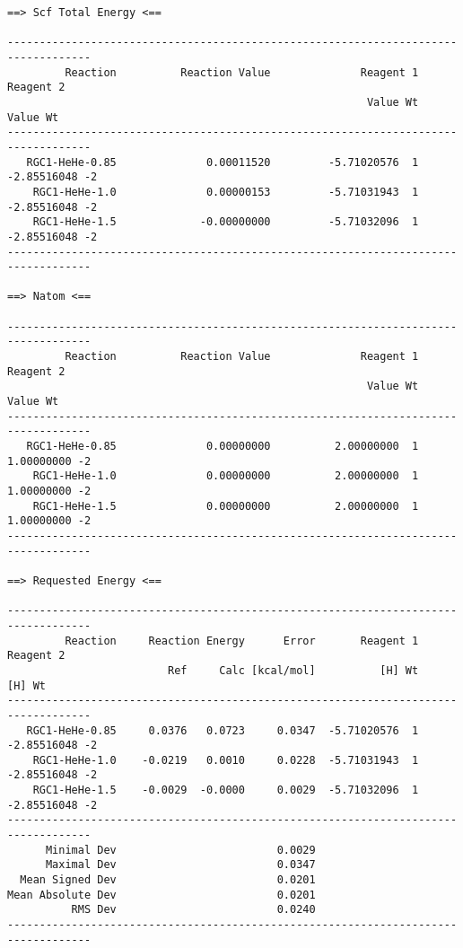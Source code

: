 \begin{verbatim}
==> Scf Total Energy <==

-----------------------------------------------------------------------------------
         Reaction          Reaction Value              Reagent 1       Reagent 2
                                                        Value Wt        Value Wt
-----------------------------------------------------------------------------------
   RGC1-HeHe-0.85              0.00011520         -5.71020576  1  -2.85516048 -2
    RGC1-HeHe-1.0              0.00000153         -5.71031943  1  -2.85516048 -2
    RGC1-HeHe-1.5             -0.00000000         -5.71032096  1  -2.85516048 -2
-----------------------------------------------------------------------------------

==> Natom <==

-----------------------------------------------------------------------------------
         Reaction          Reaction Value              Reagent 1       Reagent 2
                                                        Value Wt        Value Wt
-----------------------------------------------------------------------------------
   RGC1-HeHe-0.85              0.00000000          2.00000000  1   1.00000000 -2
    RGC1-HeHe-1.0              0.00000000          2.00000000  1   1.00000000 -2
    RGC1-HeHe-1.5              0.00000000          2.00000000  1   1.00000000 -2
-----------------------------------------------------------------------------------

==> Requested Energy <==

-----------------------------------------------------------------------------------
         Reaction     Reaction Energy      Error       Reagent 1       Reagent 2
                         Ref     Calc [kcal/mol]          [H] Wt          [H] Wt
-----------------------------------------------------------------------------------
   RGC1-HeHe-0.85     0.0376   0.0723     0.0347  -5.71020576  1  -2.85516048 -2
    RGC1-HeHe-1.0    -0.0219   0.0010     0.0228  -5.71031943  1  -2.85516048 -2
    RGC1-HeHe-1.5    -0.0029  -0.0000     0.0029  -5.71032096  1  -2.85516048 -2
-----------------------------------------------------------------------------------
      Minimal Dev                         0.0029
      Maximal Dev                         0.0347
  Mean Signed Dev                         0.0201
Mean Absolute Dev                         0.0201
          RMS Dev                         0.0240
-----------------------------------------------------------------------------------
\end{verbatim}


